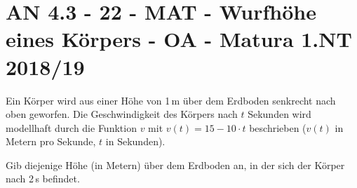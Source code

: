 \section{AN 4.3 - 22 - MAT - Wurfhöhe eines Körpers - OA - Matura 1.NT 2018/19}

\begin{beispiel}[AN 4.3]{1}
Ein Körper wird aus einer Höhe von 1\,m über dem Erdboden senkrecht nach oben geworfen. Die Geschwindigkeit des Körpers nach $t$ Sekunden wird modellhaft durch die Funktion $v$ mit $v(t)=15-10\cdot t$ beschrieben ($v(t)$ in Metern pro Sekunde, $t$ in Sekunden).

Gib diejenige Höhe (in Metern) über dem Erdboden an, in der sich der Körper nach 2\,s befindet.

\end{beispiel}